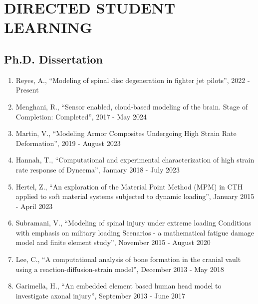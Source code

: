 \documentclass[a4paper,10pt]{article}
\begin{document}
\section*{DIRECTED STUDENT LEARNING}
\subsection*{Ph.D. Dissertation}
\begin{enumerate}
\item Reyes, A., ``Modeling of spinal disc degeneration in fighter jet pilots'', 2022 - Present
\item Menghani, R., ``Sensor enabled, cloud-based modeling of the brain. Stage of Completion: Completed'', 2017 - May 2024
\item Martin, V., ``Modeling Armor Composites Undergoing High Strain Rate Deformation'', 2019 - August 2023
\item Hannah, T., ``Computational and experimental characterization of high strain rate response of Dyneema'', January 2018 - July 2023
\item Hertel, Z., ``An exploration of the Material Point Method (MPM) in CTH applied to soft material systems subjected to dynamic loading'', January 2015 - April 2023
\item Subramani, V., ``Modeling of spinal injury under extreme loading Conditions with emphasis on military loading Scenarios - a mathematical fatigue damage model and finite element study'', November 2015 - August 2020
\item Lee, C., ``A computational analysis of bone formation in the cranial vault using a reaction-diffusion-strain model'', December 2013 - May 2018
\item Garimella, H., ``An embedded element based human head model to investigate axonal injury'', September 2013 - June 2017
\end{enumerate}
\end{document}
